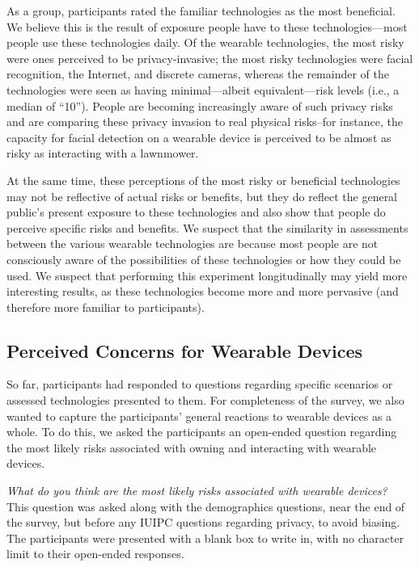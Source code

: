 \documentclass{acm_proc_article-sp}
\begin{document}
As a group, participants rated the familiar technologies as the most beneficial. We believe this is the result of exposure people have to these technologies---most people use these technologies daily. Of the wearable technologies, the most risky were ones perceived to be privacy-invasive; the most risky technologies were facial recognition, the Internet, and discrete cameras, whereas the remainder of the technologies were seen as having minimal---albeit equivalent---risk levels (i.e., a median of ``10''). People are becoming increasingly aware of such privacy risks and are comparing these privacy invasion to real physical risks--for instance, the capacity for facial detection on a wearable device is perceived to be almost as risky as interacting with a lawnmower.

At the same time, these perceptions of the most risky or beneficial technologies may not be reflective of actual risks or benefits, but they do reflect the general public's present exposure to these technologies and also show that people do perceive specific risks and benefits. We suspect that the similarity in assessments between the various wearable technologies are because most people are not consciously aware of the possibilities of these technologies or how they could be used. We suspect that performing this experiment longitudinally may yield more interesting results, as these technologies become more and more pervasive (and therefore more familiar to participants).

\subsection{Perceived Concerns for Wearable Devices}
So far, participants had responded to questions regarding specific scenarios or assessed technologies presented to them. For completeness of the survey, we also wanted to capture the participants' general reactions to wearable devices as a whole. To do this, we asked the participants an open-ended question regarding the most likely risks associated with owning and interacting with wearable devices.

\textit{What do you think are the most likely risks associated with wearable devices?}\\[-.5cm]

This question was asked along with the demographics questions, near the end of the survey, but before any IUIPC questions regarding privacy, to avoid biasing. The participants were presented with a blank box to write in, with no character limit to their open-ended responses. 
\end{document}
